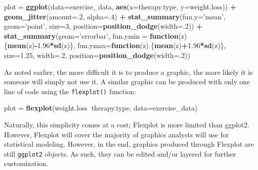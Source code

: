\documentclass[,]{book}
\newenvironment{Shaded}{\begin{snugshade}}{\end{snugshade}}
\newcommand{\KeywordTok}[1]{\textcolor[rgb]{0.13,0.29,0.53}{\textbf{#1}}}
\newcommand{\DataTypeTok}[1]{\textcolor[rgb]{0.13,0.29,0.53}{#1}}
\newcommand{\DecValTok}[1]{\textcolor[rgb]{0.00,0.00,0.81}{#1}}
\newcommand{\FloatTok}[1]{\textcolor[rgb]{0.00,0.00,0.81}{#1}}
\newcommand{\StringTok}[1]{\textcolor[rgb]{0.31,0.60,0.02}{#1}}
\newcommand{\ControlFlowTok}[1]{\textcolor[rgb]{0.13,0.29,0.53}{\textbf{#1}}}
\newcommand{\OperatorTok}[1]{\textcolor[rgb]{0.81,0.36,0.00}{\textbf{#1}}}
\newcommand{\NormalTok}[1]{#1}
\begin{document}
\begin{Shaded}
\begin{Highlighting}[]
\NormalTok{plot =}\StringTok{ }\KeywordTok{ggplot}\NormalTok{(}\DataTypeTok{data=}\NormalTok{exercise_data, }\KeywordTok{aes}\NormalTok{(}\DataTypeTok{x=}\NormalTok{therapy.type, }\DataTypeTok{y=}\NormalTok{weight.loss)) }\OperatorTok{+}
\StringTok{  }\KeywordTok{geom_jitter}\NormalTok{(}\DataTypeTok{amount=}\NormalTok{.}\DecValTok{2}\NormalTok{, }\DataTypeTok{alpha=}\NormalTok{.}\DecValTok{4}\NormalTok{) }\OperatorTok{+}
\StringTok{  }\KeywordTok{stat_summary}\NormalTok{(}\DataTypeTok{fun.y=}\StringTok{'mean'}\NormalTok{, }\DataTypeTok{geom=}\StringTok{'point'}\NormalTok{, }
               \DataTypeTok{size=}\DecValTok{3}\NormalTok{, }\DataTypeTok{position=}\KeywordTok{position_dodge}\NormalTok{(}\DataTypeTok{width=}\NormalTok{.}\DecValTok{2}\NormalTok{)) }\OperatorTok{+}
\StringTok{  }\KeywordTok{stat_summary}\NormalTok{(}\DataTypeTok{geom=}\StringTok{'errorbar'}\NormalTok{, }\DataTypeTok{fun.ymin =} \ControlFlowTok{function}\NormalTok{(z)\{}\KeywordTok{mean}\NormalTok{(z)}\OperatorTok{-}\FloatTok{1.96}\OperatorTok{*}\KeywordTok{sd}\NormalTok{(z)\}, }
               \DataTypeTok{fun.ymax=}\ControlFlowTok{function}\NormalTok{(z) \{}\KeywordTok{mean}\NormalTok{(z)}\OperatorTok{+}\FloatTok{1.96}\OperatorTok{*}\KeywordTok{sd}\NormalTok{(z)\}, }
               \DataTypeTok{size=}\FloatTok{1.25}\NormalTok{, }\DataTypeTok{width=}\NormalTok{.}\DecValTok{2}\NormalTok{, }\DataTypeTok{position=}\KeywordTok{position_dodge}\NormalTok{(}\DataTypeTok{width=}\NormalTok{.}\DecValTok{2}\NormalTok{)) }
\end{Highlighting}
\end{Shaded}

As noted earlier, the more difficult it is to produce a graphic, the
more likely it is someone will simply not use it. A similar graphic can
be produced with only one line of code using the \texttt{flexplot()}
function:

\begin{Shaded}
\begin{Highlighting}[]
\NormalTok{plot =}\StringTok{ }\KeywordTok{flexplot}\NormalTok{(weight.loss}\OperatorTok{~}\NormalTok{therapy.type, }\DataTypeTok{data=}\NormalTok{exercise_data)}
\end{Highlighting}
\end{Shaded}

Naturally, this simplicity comes at a cost; Flexplot is more limited
than ggplot2. However, Flexplot will cover the majority of graphics
analysts will use for statistical modeling. However, in the end,
graphics produced through Flexplot are still \texttt{ggplot2} objects.
As such, they can be edited and/or layered for further customization.
\end{document}
